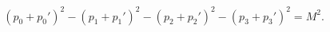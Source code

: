 \begin{equation}
(p_0+p_0')^2-(p_1+p_1')^2-(p_2+p_2')^2-(p_3+p_3')^2 = M^2. \label{5-2}
\end{equation}

